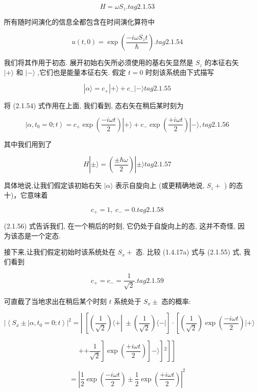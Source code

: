 \documentclass[lang=cn,newtx,10pt,scheme=chinese,thmcnt=section]{elegantbook}
\begin{document}
$$
H = \omega {S}_{z}. tag{2.1.53}
$$

所有随时间演化的信息全都包含在时间演化算符中

$$
u\left( {t,0}\right) = \exp \left( \frac{-{i\omega }{S}_{z}t}{\hbar }\right) . tag{2.1.54}
$$

我们将其作用于初态. 展开初始右矢所必须使用的基右矢显然是 ${S}_{z}$ 的本征右矢 $| + \rangle$ 和 $| - \rangle$ ,它们也是能量本征右矢. 假定 $t = 0$ 时刻该系统由下式描写

$$
\left| {\alpha \rangle = {c}_{ + }}\right| + \rangle + {c}_{ - }| - \rangle tag{2.1.55}
$$

将 (2.1.54) 式作用在上面, 我们看到, 态右矢在稍后某时刻为

$$
\left| {\alpha ,{t}_{0} = 0;t}\right\rangle = {c}_{ + }\exp \left( \frac{-{i\omega t}}{2}\right) \left| {+\rangle + {c}_{ - }\exp \left( \frac{+{i\omega t}}{2}\right) }\right| - \rangle , tag{2.1.56}
$$

其中我们用到了

$$
H\left| {\pm \rangle = \left( \frac{\pm \hbar \omega }{2}\right) }\right| \pm \rangle tag{2.1.57}
$$

具体地说,让我们假定该初始右矢 $|\alpha \rangle$ 表示自旋向上 (或更精确地说, ${S}_{z} +$ ) 的态十)，它意味着

$$
{c}_{ + } = 1,\;{c}_{ - } = 0. tag{2.1.58}
$$

(2.1.56) 式告诉我们, 在一个稍后的时刻, 它仍处于自旋向上的态, 这并不奇怪, 因为该态是一个定态.

接下来,让我们假定初始时该系统处在 ${S}_{x} +$ 态. 比较 (1.4.17a) 式与 (2.1.55) 式, 我们看到

$$
{c}_{ + } = {c}_{ - } = \frac{1}{\sqrt{2}}. tag{2.1.59}
$$

可直截了当地求出在稍后某个时刻 $t$ 系统处于 ${S}_{x} \pm$ 态的概率:

$$
{\left| \left\langle {S}_{x} \pm | \alpha ,{t}_{0} = 0;t\right\rangle \right| }^{2} = \left| {\;\left\lbrack {\left( \frac{1}{\sqrt{2}}\right) \langle + \left| {\; \pm \left( \frac{1}{\sqrt{2}}\right) \langle - | }\right. }\right\rbrack \cdot \left\lbrack {\left( \frac{1}{\sqrt{2}}\right) \exp \left( \frac{-{i\omega t}}{2}\right) | + \rangle }\right. }\right.
$$

$$
+ \left. \left. {\left. {\left. {\left. {+\frac{1}{\sqrt{2}}}\right\rbrack \exp \left( \frac{+{i\omega t}}{2}\right) }\right\rbrack -\rangle }\right\rbrack {}^{2}}\right\rbrack \right\rbrack
$$

$$
= {\left| \frac{1}{2}\exp \left( \frac{-{i\omega t}}{2}\right) \pm \frac{1}{2}\exp \left( \frac{+{i\omega t}}{2}\right) \right| }^{2}
$$
\end{document}
